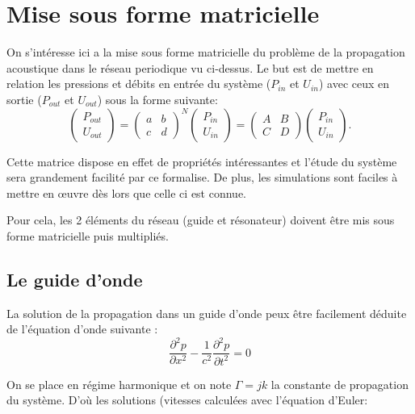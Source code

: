 \section{Mise sous forme matricielle}
On s’intéresse ici a la mise sous forme matricielle du problème de la propagation acoustique dans le réseau periodique vu ci-dessus. Le but est de mettre en relation les pressions et débits en entrée du système ($P_{in}$ et $U_{in}$) avec ceux en sortie ($P_{out}$ et $U_{out}$) sous la forme suivante:
\begin{equation}
\begin{pmatrix} P_{out} \\ U_{out} \end{pmatrix} =\begin{pmatrix} a & b \\ c & d \end{pmatrix}^N \begin{pmatrix} P_{in} \\ U_{in} \end{pmatrix} = \begin{pmatrix} A & B \\ C & D \end{pmatrix} \begin{pmatrix} P_{in} \\ U_{in} \end{pmatrix} .
\end{equation}

Cette matrice dispose en effet de propriétés intéressantes et l'étude du système sera grandement facilité par ce formalise. De plus, les simulations sont faciles à mettre en œuvre dès lors que celle ci est connue.

Pour cela, les 2 éléments du réseau (guide et résonateur) doivent être mis sous forme matricielle puis multipliés.

\subsection{Le guide d'onde}
La solution de la propagation dans un guide d'onde peux être facilement déduite de l'équation d'onde suivante :
\begin{equation}
\frac{\partial ^2 p}{\partial x^2} -\frac{1}{c^{2}} \frac{\partial ^2 p}{\partial t^2}= 0
\end{equation}

On se place en régime harmonique et on note $\Gamma = jk$ la constante de propagation du système. D’où les solutions (vitesses calculées avec l'équation d'Euler:

